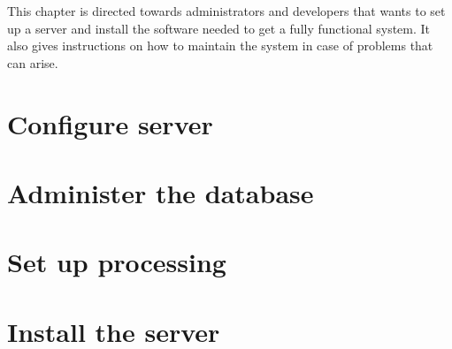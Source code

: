 
This chapter is directed towards administrators and developers that wants to set up a server and install the software needed to get a fully functional system. It also gives instructions on how to maintain the system in case of problems that can arise.

\section{Configure server}


\section{Administer the database}


\section{Set up processing}


\section{Install the server}

